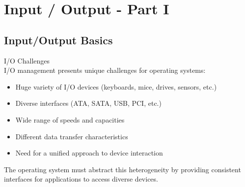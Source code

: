 \section{Input / Output - Part I}

\subsection{Input/Output Basics}

\begin{concept}{I/O Challenges}\\
    I/O management presents unique challenges for operating systems:
    \begin{itemize}
        \item Huge variety of I/O devices (keyboards, mice, drives, sensors, etc.)
        \item Diverse interfaces (ATA, SATA, USB, PCI, etc.)
        \item Wide range of speeds and capacities
        \item Different data transfer characteristics
        \item Need for a unified approach to device interaction
    \end{itemize}
    
    The operating system must abstract this heterogeneity by providing consistent interfaces for applications to access diverse devices.
\end{concept}

